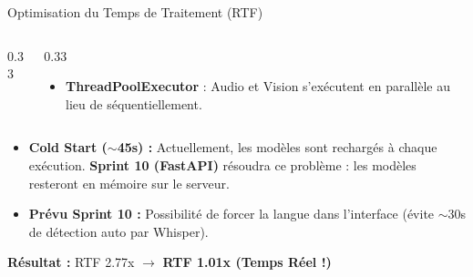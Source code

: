 \documentclass[10pt,aspectratio=169]{beamer}
\begin{document}
\begin{frame}{Optimisation du Temps de Traitement (RTF)}
\begin{columns}[T]
\begin{column}{0.33\textwidth}
        \end{column}
        \begin{column}{0.33\textwidth}
            \begin{tcolorbox}[title=\textbf{Levier Pipeline}, colframe=success!60, colback=success!3]
                \scriptsize
                \begin{itemize}
                    \item \textbf{ThreadPoolExecutor} : Audio et Vision s'exécutent en parallèle au lieu de séquentiellement.
                \end{itemize}
            \end{tcolorbox}
        \end{column}
    \end{columns}
    \vspace{0.2cm}
    \begin{itemize} \scriptsize
        \item \textbf{Cold Start ($\sim$45s) :} Actuellement, les modèles sont rechargés à chaque exécution. \textbf{Sprint 10 (FastAPI)} résoudra ce problème : les modèles resteront en mémoire sur le serveur.
        \item \textbf{Prévu Sprint 10 :} Possibilité de forcer la langue dans l'interface (évite $\sim$30s de détection auto par Whisper).
    \end{itemize}
    \vspace{0.2cm}
    \begin{center}
        \textbf{Résultat :} \textcolor{danger}{RTF 2.77x} $\longrightarrow$ \textcolor{success}{\textbf{RTF 1.01x (Temps Réel !)}}
    \end{center}
\end{frame}
\end{document}
